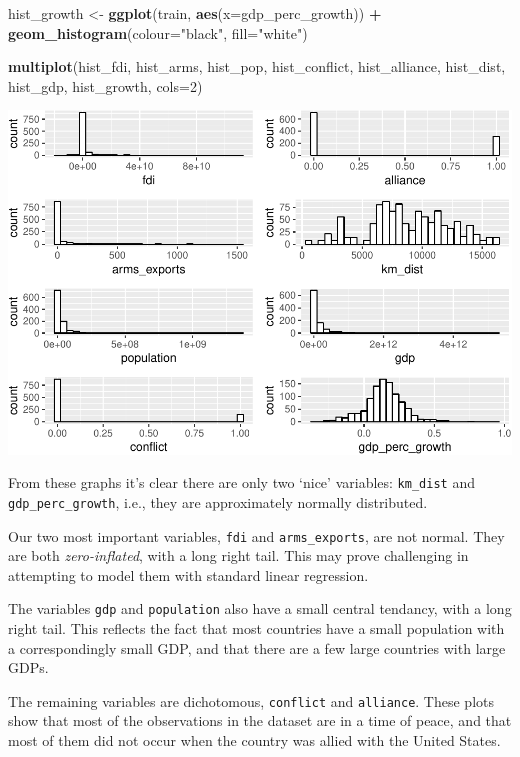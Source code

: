 \documentclass[11pt,]{article}
\newenvironment{Shaded}{\begin{snugshade}}{\end{snugshade}}
\newcommand{\DataTypeTok}[1]{\textcolor[rgb]{0.13,0.29,0.53}{#1}}
\newcommand{\DecValTok}[1]{\textcolor[rgb]{0.00,0.00,0.81}{#1}}
\newcommand{\KeywordTok}[1]{\textcolor[rgb]{0.13,0.29,0.53}{\textbf{#1}}}
\newcommand{\NormalTok}[1]{#1}
\newcommand{\OperatorTok}[1]{\textcolor[rgb]{0.81,0.36,0.00}{\textbf{#1}}}
\newcommand{\StringTok}[1]{\textcolor[rgb]{0.31,0.60,0.02}{#1}}
\begin{document}
\begin{Shaded}
\begin{Highlighting}[]
\NormalTok{hist_growth <-}\StringTok{ }\KeywordTok{ggplot}\NormalTok{(train, }\KeywordTok{aes}\NormalTok{(}\DataTypeTok{x=}\NormalTok{gdp_perc_growth)) }\OperatorTok{+}\StringTok{ }
\StringTok{    }\KeywordTok{geom_histogram}\NormalTok{(}\DataTypeTok{colour=}\StringTok{"black"}\NormalTok{, }\DataTypeTok{fill=}\StringTok{"white"}\NormalTok{)}

\KeywordTok{multiplot}\NormalTok{(hist_fdi, hist_arms, hist_pop, hist_conflict, }
\NormalTok{          hist_alliance, hist_dist, hist_gdp, hist_growth, }\DataTypeTok{cols=}\DecValTok{2}\NormalTok{)}
\end{Highlighting}
\end{Shaded}

\includegraphics{report_files/figure-latex/unnamed-chunk-9-1.pdf}

From these graphs it's clear there are only two `nice' variables:
\texttt{km\_dist} and \texttt{gdp\_perc\_growth}, i.e., they are
approximately normally distributed.

Our two most important variables, \texttt{fdi} and
\texttt{arms\_exports}, are not normal. They are both
\emph{zero-inflated}, with a long right tail. This may prove challenging
in attempting to model them with standard linear regression.

The variables \texttt{gdp} and \texttt{population} also have a small
central tendancy, with a long right tail. This reflects the fact that
most countries have a small population with a correspondingly small GDP,
and that there are a few large countries with large GDPs.

The remaining variables are dichotomous, \texttt{conflict} and
\texttt{alliance}. These plots show that most of the observations in the
dataset are in a time of peace, and that most of them did not occur when
the country was allied with the United States.
\end{document}
